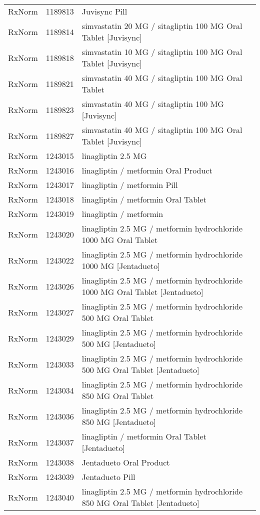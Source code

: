 \begin{longtable}{p{}p{}p{}}
  RxNorm & 1189813 & Juvisync Pill \\ 
  RxNorm & 1189814 & simvastatin 20 MG / sitagliptin 100 MG Oral Tablet [Juvisync] \\ 
  RxNorm & 1189818 & simvastatin 10 MG / sitagliptin 100 MG Oral Tablet [Juvisync] \\ 
  RxNorm & 1189821 & simvastatin 40 MG / sitagliptin 100 MG Oral Tablet \\ 
  RxNorm & 1189823 & simvastatin 40 MG / sitagliptin 100 MG [Juvisync] \\ 
  RxNorm & 1189827 & simvastatin 40 MG / sitagliptin 100 MG Oral Tablet [Juvisync] \\ 
  RxNorm & 1243015 & linagliptin 2.5 MG \\ 
  RxNorm & 1243016 & linagliptin / metformin Oral Product \\ 
  RxNorm & 1243017 & linagliptin / metformin Pill \\ 
  RxNorm & 1243018 & linagliptin / metformin Oral Tablet \\ 
  RxNorm & 1243019 & linagliptin / metformin \\ 
  RxNorm & 1243020 & linagliptin 2.5 MG / metformin hydrochloride 1000 MG Oral Tablet \\ 
  RxNorm & 1243022 & linagliptin 2.5 MG / metformin hydrochloride 1000 MG [Jentadueto] \\ 
  RxNorm & 1243026 & linagliptin 2.5 MG / metformin hydrochloride 1000 MG Oral Tablet [Jentadueto] \\ 
  RxNorm & 1243027 & linagliptin 2.5 MG / metformin hydrochloride 500 MG Oral Tablet \\ 
  RxNorm & 1243029 & linagliptin 2.5 MG / metformin hydrochloride 500 MG [Jentadueto] \\ 
  RxNorm & 1243033 & linagliptin 2.5 MG / metformin hydrochloride 500 MG Oral Tablet [Jentadueto] \\ 
  RxNorm & 1243034 & linagliptin 2.5 MG / metformin hydrochloride 850 MG Oral Tablet \\ 
  RxNorm & 1243036 & linagliptin 2.5 MG / metformin hydrochloride 850 MG [Jentadueto] \\ 
  RxNorm & 1243037 & linagliptin / metformin Oral Tablet [Jentadueto] \\ 
  RxNorm & 1243038 & Jentadueto Oral Product \\ 
  RxNorm & 1243039 & Jentadueto Pill \\ 
  RxNorm & 1243040 & linagliptin 2.5 MG / metformin hydrochloride 850 MG Oral Tablet [Jentadueto] \\ 

\end{longtable}
